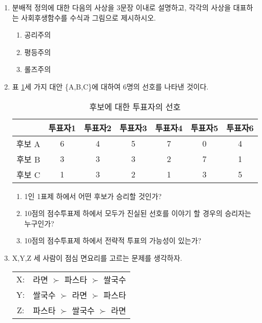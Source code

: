 \documentclass{article}
\begin{document}
\begin{enumerate}[{\bf 문제 \arabic*.}]
    \item 분배적 정의에 대한 다음의 사상을 3문장 이내로 설명하고, 각각의 사상을 대표하는 사회후생함수를 수식과 그림으로 제시하시오.
        \begin{enumerate}
            \item 공리주의
            \item 평등주의
            \item 롤즈주의
        \end{enumerate}
    \item 표 \ref{tab:scov}\는 세 가지 대안 \{A,B,C\}에 대하여 6명의 선호를 나타낸 것이다. 
        \begin{table}[htbp]
            \centering
            \begin{tabular}{c|c|c|c|c|c|c}
                \toprule
                              & 투표자1 & 투표자2 & 투표자3 & 투표자4 & 투표자5 & 투표자6 \\
                \hline 후보 A & 6 & 4 & 5 & 7 & 0 & 4 \\
                       후보 B & 3 & 3 & 3 & 2 & 7 & 1 \\
                       후보 C & 1 & 3 & 2 & 1 & 3 & 5 \\
                \bottomrule
            \end{tabular}
            \caption{후보에 대한 투표자의 선호}
            \label{tab:scov}
        \end{table}
        \begin{enumerate}
            \item 1인 1표제 하에서 어떤 후보가 승리할 것인가?
            \item 10점의 점수투표제 하에서 모두가 진실된 선호를 이야기 할 경우의 승리자는 누구인가?
            \item 10점의 점수투표제 하에서 전략적 투표의 가능성이 있는가?
        \end{enumerate}
    \item X,Y,Z 세 사람이 점심 면요리를 고르는 문제를 생각하자. 
        \begin{table}[htbp]
            \centering
            \begin{tabular}{cc}
                 X: & 라면 $\succ$ 파스타 $\succ$ 쌀국수 \\
                 Y: & 쌀국수 $\succ$ 라면 $\succ$ 파스타 \\
                 Z: & 파스타 $\succ$ 쌀국수 $\succ$ 라면
            \end{tabular}

\end{table}
\end{enumerate}
\end{document}
